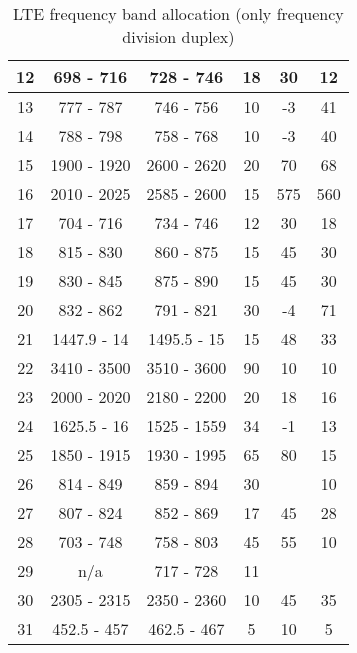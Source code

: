 \begin{table}[]
\begin{tabular}{|c|c|c|c|c|c|}
    12 & 698 - 716   & 728 - 746   & 18 & 30  & 12  \\ \hline
    13 & 777 - 787   & 746 - 756   & 10 & -3  & 41  \\ \hline
    14 & 788 - 798   & 758 - 768   & 10 & -3  & 40  \\ \hline
    15 & 1900 - 1920 & 2600 - 2620 & 20 & 70  & 68  \\ \hline
    16 & 2010 - 2025 & 2585 - 2600 & 15 & 575 & 560 \\ \hline
    17 & 704 - 716   & 734 - 746   & 12 & 30  & 18  \\ \hline
    18 & 815 - 830   & 860 - 875   & 15 & 45  & 30  \\ \hline
    19 & 830 - 845   & 875 - 890   & 15 & 45  & 30  \\ \hline
    20 & 832 - 862   & 791 - 821   & 30 & -4  & 71  \\ \hline
    21 & 1447.9 - 14 & 1495.5 - 15 & 15 & 48  & 33  \\ \hline
    22 & 3410 - 3500 & 3510 - 3600 & 90 & 10  & 10  \\ \hline
    23 & 2000 - 2020 & 2180 - 2200 & 20 & 18  & 16  \\ \hline
    24 & 1625.5 - 16 & 1525 - 1559 & 34 & -1  & 13  \\ \hline
    25 & 1850 - 1915 & 1930 - 1995 & 65 & 80  & 15  \\ \hline
    26 & 814 - 849   & 859 - 894   & 30 &     & 10  \\ \hline
    27 & 807 - 824   & 852 - 869   & 17 & 45  & 28  \\ \hline
    28 & 703 - 748   & 758 - 803   & 45 & 55  & 10  \\ \hline
    29 & n/a         & 717 - 728   & 11 &     &     \\ \hline
    30 & 2305 - 2315 & 2350 - 2360 & 10 & 45  & 35  \\ \hline
    31 & 452.5 - 457 & 462.5 - 467 & 5  & 10  & 5   \\ \hline
  \end{tabular}
  \caption{LTE frequency band allocation (only frequency division duplex) \cite{radio2015electronics}}
  \label{tab:ltefreqband}
\end{table}

